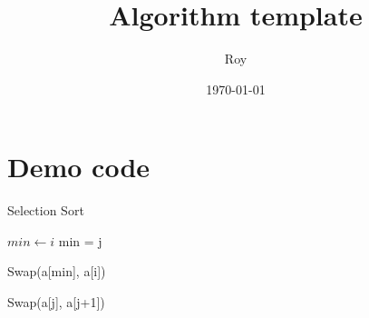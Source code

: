 \documentclass[a4paper]{article}
\title{Algorithm template}
\author{Roy}
\date{\today}    %
\begin{document}
\maketitle
\section{Demo code}

\begin{algorithm}
\caption{Selection Sort}
\begin{algorithmic}

		\State $min \gets i$
				min = j
			\EndIf
		\EndFor
		
			\State Swap(a[min], a[i])
		\EndIf
	\EndFor
\EndProcedure

\end{algorithmic}
\end{algorithm}

\begin{algorithm}
	\begin{algorithmic}
						\State Swap(a[j], a[j+1])
					\EndIf
				\EndFor
			\EndFor
		\EndProcedure
	\end{algorithmic}
\end{algorithm}
\end{document}
